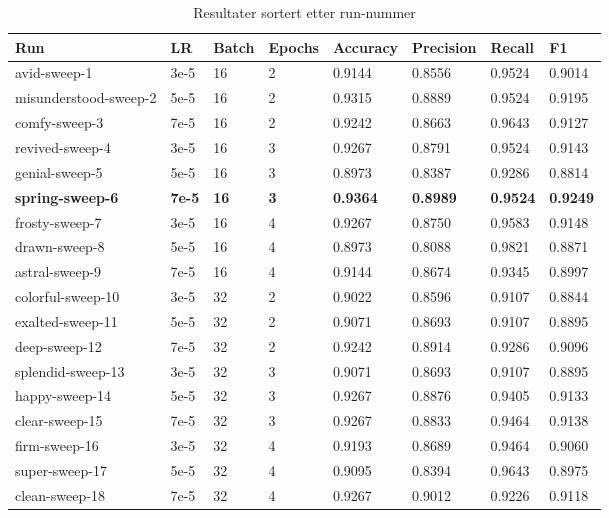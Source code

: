 \begin{table}
\caption{Resultater sortert etter run-nummer}
\label{tab:results}
\begin{tabular}{llllllll}
\toprule
Run & LR & Batch & Epochs & Accuracy & Precision & Recall & F1 \\
\midrule
avid-sweep-1 & 3e-5 & 16 & 2 & 0.9144 & 0.8556 & 0.9524 & 0.9014 \\
misunderstood-sweep-2 & 5e-5 & 16 & 2 & 0.9315 & 0.8889 & 0.9524 & 0.9195 \\
comfy-sweep-3 & 7e-5 & 16 & 2 & 0.9242 & 0.8663 & 0.9643 & 0.9127 \\
revived-sweep-4 & 3e-5 & 16 & 3 & 0.9267 & 0.8791 & 0.9524 & 0.9143 \\
genial-sweep-5 & 5e-5 & 16 & 3 & 0.8973 & 0.8387 & 0.9286 & 0.8814 \\
\textbf{spring-sweep-6} & \textbf{7e-5} & \textbf{16} & \textbf{3} & \textbf{0.9364} & \textbf{0.8989} & \textbf{0.9524} & \textbf{0.9249} \\
frosty-sweep-7 & 3e-5 & 16 & 4 & 0.9267 & 0.8750 & 0.9583 & 0.9148 \\
drawn-sweep-8 & 5e-5 & 16 & 4 & 0.8973 & 0.8088 & 0.9821 & 0.8871 \\
astral-sweep-9 & 7e-5 & 16 & 4 & 0.9144 & 0.8674 & 0.9345 & 0.8997 \\
colorful-sweep-10 & 3e-5 & 32 & 2 & 0.9022 & 0.8596 & 0.9107 & 0.8844 \\
exalted-sweep-11 & 5e-5 & 32 & 2 & 0.9071 & 0.8693 & 0.9107 & 0.8895 \\
deep-sweep-12 & 7e-5 & 32 & 2 & 0.9242 & 0.8914 & 0.9286 & 0.9096 \\
splendid-sweep-13 & 3e-5 & 32 & 3 & 0.9071 & 0.8693 & 0.9107 & 0.8895 \\
happy-sweep-14 & 5e-5 & 32 & 3 & 0.9267 & 0.8876 & 0.9405 & 0.9133 \\
clear-sweep-15 & 7e-5 & 32 & 3 & 0.9267 & 0.8833 & 0.9464 & 0.9138 \\
firm-sweep-16 & 3e-5 & 32 & 4 & 0.9193 & 0.8689 & 0.9464 & 0.9060 \\
super-sweep-17 & 5e-5 & 32 & 4 & 0.9095 & 0.8394 & 0.9643 & 0.8975 \\
clean-sweep-18 & 7e-5 & 32 & 4 & 0.9267 & 0.9012 & 0.9226 & 0.9118 \\
\bottomrule
\end{tabular}
\end{table}
